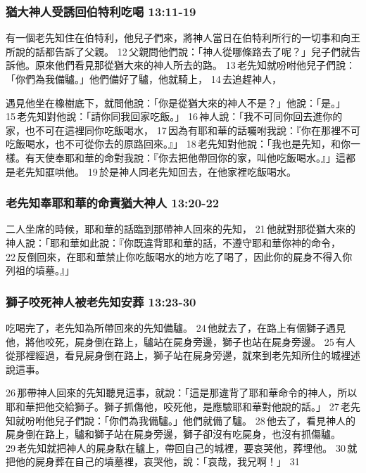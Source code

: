 \subsubsection{猶大神人受誘回伯特利吃喝 13:11-19}
有一個老先知住在伯特利，他兒子們來，將神人當日在伯特利所行的一切事和向王所說的話都告訴了父親。 12 父親問他們說：「神人從哪條路去了呢？」兒子們就告訴他。原來他們看見那從猶大來的神人所去的路。 13 老先知就吩咐他兒子們說：「你們為我備驢。」他們備好了驢，他就騎上， 14 去追趕神人，

遇見他坐在橡樹底下，就問他說：「你是從猶大來的神人不是？」他說：「是。」 15 老先知對他說：「請你同我回家吃飯。」 16 神人說：「我不可同你回去進你的家，也不可在這裡同你吃飯喝水， 17 因為有耶和華的話囑咐我說：『你在那裡不可吃飯喝水，也不可從你去的原路回來。』」 18 老先知對他說：「我也是先知，和你一樣。有天使奉耶和華的命對我說：『你去把他帶回你的家，叫他吃飯喝水。』」這都是老先知誆哄他。 19 於是神人同老先知回去，在他家裡吃飯喝水。

\subsubsection{老先知奉耶和華的命責猶大神人 13:20-22}
二人坐席的時候，耶和華的話臨到那帶神人回來的先知， 21 他就對那從猶大來的神人說：「耶和華如此說：『你既違背耶和華的話，不遵守耶和華你神的命令， 22 反倒回來，在耶和華禁止你吃飯喝水的地方吃了喝了，因此你的屍身不得入你列祖的墳墓。』」

\subsubsection{獅子咬死神人被老先知安葬 13:23-30}
吃喝完了，老先知為所帶回來的先知備驢。 24 他就去了，在路上有個獅子遇見他，將他咬死，屍身倒在路上，驢站在屍身旁邊，獅子也站在屍身旁邊。 25 有人從那裡經過，看見屍身倒在路上，獅子站在屍身旁邊，就來到老先知所住的城裡述說這事。

26 那帶神人回來的先知聽見這事，就說：「這是那違背了耶和華命令的神人，所以耶和華把他交給獅子。獅子抓傷他，咬死他，是應驗耶和華對他說的話。」 27 老先知就吩咐他兒子們說：「你們為我備驢。」他們就備了驢。 28 他去了，看見神人的屍身倒在路上，驢和獅子站在屍身旁邊，獅子卻沒有吃屍身，也沒有抓傷驢。 29 老先知就把神人的屍身馱在驢上，帶回自己的城裡，要哀哭他，葬埋他。 30 就把他的屍身葬在自己的墳墓裡，哀哭他，說：「哀哉，我兄啊！」 31 

